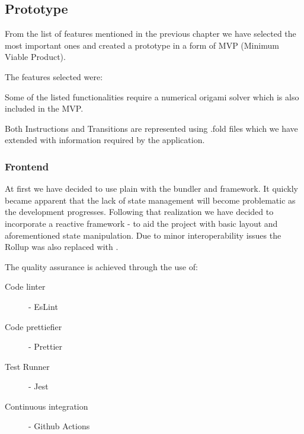 \subsection{Prototype}

From the list of features mentioned in the previous chapter we have selected the most important ones and created a prototype in a form of MVP (Minimum Viable Product). 


The features selected were:

\begin{enumerate}
\end{enumerate}

Some of the listed functionalities require a numerical origami solver which is also included in the MVP.

Both Instructions and Transitions are represented using .fold files which we have extended with information required by the application.

\subsubsection{Frontend}

At first we have decided to use plain  with the  bundler and  framework.
It quickly became apparent that the lack of state management will become problematic as the development progresses. Following that realization we have decided to incorporate a reactive framework -  to aid the project with basic layout and aforementioned state manipulation. 
Due to minor interoperability issues the Rollup was also replaced with .

The quality assurance is achieved through the use of:

\begin{description}
\item[Code linter] - EsLint
\item[Code prettiefier] - Prettier
\item[Test Runner] - Jest
\item[Continuous integration] - Github Actions
\end{description}

